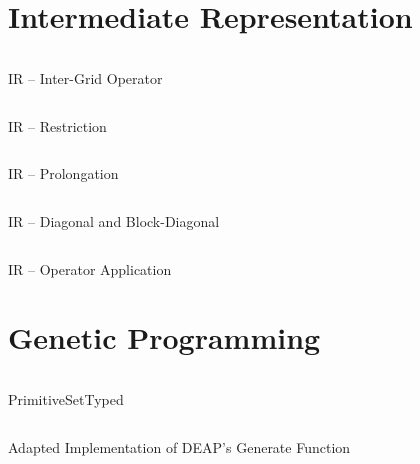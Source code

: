\section{Intermediate Representation}
\label{appendix:ir}
\begin{listing}[!htb]
	\inputminted{python}{evostencils/ir/inter_grid_operator.py}
	\caption{IR -- Inter-Grid Operator}
	\label{code:ir:inter-grid-operator}
\end{listing}
\begin{listing}[!htb]
	\inputminted{python}{evostencils/ir/restriction.py}
	\caption{IR -- Restriction}
	\label{code:ir:restriction}
\end{listing}
\begin{listing}[!htb]
	\inputminted{python}{evostencils/ir/prolongation.py}
	\caption{IR -- Prolongation}
	\label{code:ir:prolongation}
\end{listing}
\begin{listing}[!htb]
	\inputminted{python}{evostencils/ir/diagonal.py}
	\caption{IR -- Diagonal and Block-Diagonal}
	\label{code:ir:diagonal}
\end{listing}
\begin{listing}[!htb]
	\inputminted{python}{evostencils/ir/multiplication.py}
	\caption{IR -- Operator Application}
	\label{code:ir:multiplication}
\end{listing}
\clearpage
\section{Genetic Programming}
\label{appendix:gp}
\begin{listing}[!htb]
	\inputminted{python}{evostencils/gp/primitive_set_typed.py}
	\caption{PrimitiveSetTyped}
	\label{code:gp:primitive-set-typed}
\end{listing}
\begin{listing}[!htb]
	\inputminted{python}{evostencils/gp/generate.py}
	\caption{Adapted Implementation of DEAP's Generate Function}
	\label{code:gp:generate}
\end{listing}
\clearpage
